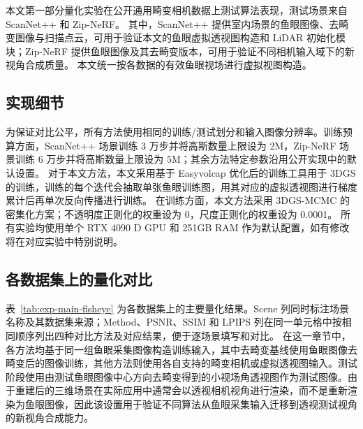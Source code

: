 本文第一部分量化实验在公开通用畸变相机数据上测试算法表现，测试场景来自 ScanNet++ \cite{yeshwanth2023scannet++} 和 Zip-NeRF。
其中，ScanNet++ 提供室内场景的鱼眼图像、去畸变图像与扫描点云，可用于验证本文的鱼眼虚拟透视图构造和 LiDAR 初始化模块；Zip-NeRF 提供鱼眼图像及其去畸变版本，可用于验证不同相机输入域下的新视角合成质量。
本文统一按各数据的有效鱼眼视场进行虚拟视图构造。

\subsection{实现细节}

为保证对比公平，所有方法使用相同的训练/测试划分和输入图像分辨率。训练预算方面，ScanNet++ 场景训练 \(3\) 万步并将高斯数量上限设为 \(2\)M，Zip-NeRF 场景训练 \(6\) 万步并将高斯数量上限设为 \(5\)M；其余方法特定参数沿用公开实现中的默认设置。
对于本文方法，本文采用基于 Easyvolcap \cite{xu2023easyvolcap} 优化后的训练工具用于 3DGS 的训练，训练的每个迭代会抽取单张鱼眼训练图，用其对应的虚拟透视图进行梯度累计后再单次反向传播进行训练。
在训练方面，本文方法采用 3DGS-MCMC 的密集化方案；不透明度正则化的权重设为 0，尺度正则化的权重设为 0.0001。
所有实验均使用单个 RTX 4090 D GPU 和 251GB RAM 作为默认配置，如有修改将在对应实验中特别说明。


\subsection{各数据集上的量化对比}

表~\ref{tab:exp-main-fisheye} 为各数据集上的主要量化结果。Scene 列同时标注场景名称及其数据集来源；Method、PSNR、SSIM 和 LPIPS 列在同一单元格中按相同顺序列出四种对比方法及对应结果，便于逐场景填写和对比。
在这一章节中，各方法均基于同一组鱼眼采集图像构造训练输入，其中去畸变基线使用鱼眼图像去畸变后的图像训练，其他方法则使用各自支持的畸变相机或虚拟透视图输入。测试阶段使用由测试鱼眼图像中心方向去畸变得到的小视场角透视图作为测试图像。由于重建后的三维场景在实际应用中通常会以透视相机视角进行渲染，而不是重新渲染为鱼眼图像，因此该设置用于验证不同算法从鱼眼采集输入迁移到透视测试视角的新视角合成能力。

